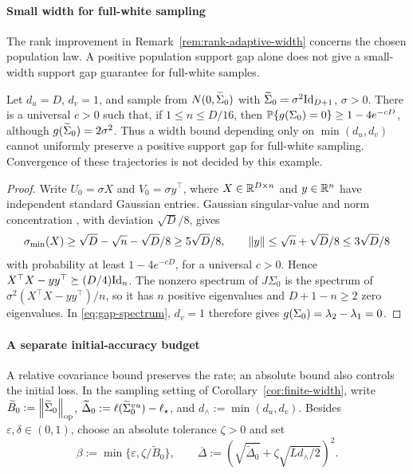 \paragraph{Small width for full-white sampling}
The rank improvement in Remark~\ref{rem:rank-adaptive-width} concerns
the chosen population law. A positive population support gap alone does not
give a small-width support gap guarantee for full-white samples.
\begin{example}
\label{ex:white-small-width}
Let $d_u=D$, $d_v=1$, and sample from $N(0,\widetilde\Sigma_0)$ with
$\widetilde\Sigma_0=\sigma^2\mathrm{Id}_{D+1}$, $\sigma>0$.
There is a universal $c>0$ such that, if
$1\le n\le D/16$, then
$\mathbb P\{g(\Sigma_0)=0\}\ge1-4e^{-cD}$,
although $g(\widetilde\Sigma_0)=2\sigma^2$.
Thus a width bound depending only on $\min(d_u,d_v)$ cannot uniformly
preserve a positive support gap for full-white sampling. Convergence of
these trajectories is not decided by this example.
\end{example}
\begin{proof}
Write $U_0=\sigma X$ and $V_0=\sigma y^\top$, where
$X\in\mathbb{R}^{D\times n}$ and $y\in\mathbb{R}^n$ have independent standard
Gaussian entries. Gaussian singular-value and norm concentration
\citep[Section~7.3]{Vershynin2018}, with deviation $\sqrt D/8$, gives
\[
 \sigma_{\min}(X)\ge\sqrt D-\sqrt n-\sqrt D/8\ge5\sqrt D/8,
 \qquad \left\lVert y \right\rVert\le\sqrt n+\sqrt D/8\le3\sqrt D/8
\]
with probability at least $1-4e^{-cD}$, for a universal $c>0$.
Hence $X^\top X-yy^\top\succeq(D/4)\mathrm{Id}_n$.
The nonzero spectrum of $J\Sigma_0$ is the spectrum of
$\sigma^2(X^\top X-yy^\top)/n$, so it has $n$ positive eigenvalues
and $D+1-n\ge2$ zero eigenvalues. In \eqref{eq:gap-spectrum},
$d_v=1$ therefore gives $g(\Sigma_0)=\lambda_2-\lambda_1=0$.
\end{proof}

\paragraph{A separate initial-accuracy budget}
A relative covariance bound preserves the rate; an absolute bound also
controls the initial loss. In the sampling setting of
Corollary~\ref{cor:finite-width}, write
$\widetilde B_0:=\left\lVert \widetilde\Sigma_0 \right\rVert_{\mathrm{op}}$, $\widetilde\Delta_0:=\ell(\widetilde{\Sigma}^{vu}_0)-\ell_\star$, and
$d_\wedge:=\min(d_u,d_v)$.
Besides $\varepsilon,\delta\in(0,1)$, choose an absolute tolerance
$\zeta>0$ and set
\begin{equation}\label{eq:sampling-budgets}
 \beta:=\min\{\varepsilon,\zeta/\widetilde B_0\},\qquad
 \overline\Delta:=
 \left(\sqrt{\widetilde\Delta_0}+\zeta\sqrt{Ld_\wedge/2}\right)^2.
\end{equation}

